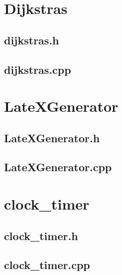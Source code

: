 \section{Dijkstras}
\label{app:dijkstras}
\subsection{dijkstras.h}
\label{app:dijkstras_h}

\bigskip
\bigskip

\subsection{dijkstras.cpp}
\label{app:dijkstras_cpp}

\bigskip
\bigskip


\section{LateXGenerator}
\label{app:LateXGenerator}
\subsection{LateXGenerator.h}
\label{app:LateXGenerator_h}

\bigskip
\bigskip

\subsection{LateXGenerator.cpp}
\label{app:LateXGenerator_cpp}

\bigskip
\bigskip

\section{clock\_timer}
\label{app:clock_timer}
\subsection{clock\_timer.h}
\label{app:clock_timer_h}

\bigskip
\bigskip

\subsection{clock\_timer.cpp}
\label{app:clock_timer_cpp}
